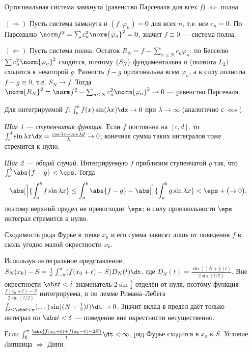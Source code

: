 \stmt Ортогональная система замкнута (равенство Парсеваля для всех $f$) $\iff$ полна.

\dok $(\Rightarrow)$ Пусть система замкнута и $(f,\varphi_n)=0$ для всех $n$, т.е. все $c_n=0$. По
Парсевалю $\norm f^2=\sum c_n^2\norm{\varphi_n}^2=0$, значит $f\equiv0$ — система полна.

$(\Leftarrow)$ Пусть система полна. Остаток $R_N=f-\sum_{n\le N}c_n\varphi_n$; по Бесселю
$\sum c_n^2\norm{\varphi_n}^2$ сходится, поэтому $\{S_N\}$ фундаментальна и (полнота $L_2$) сходится
к некоторой $g$. Разность $f-g$ ортогональна всем $\varphi_n$, а в силу полноты $f-g\equiv0$, т.е.
$S_N\to f$. Тогда $\norm{R_N}^2=\norm f^2-\sum_{n\le N}c_n^2\norm{\varphi_n}^2\to0$ — равенство
Парсеваля.

\stmt Для интегрируемой $f$: $\int_a^b f(x)\sin(\lambda x)\dx\to0$ при $\lambda\to\infty$
(аналогично с $\cos$).

\dok \emph{Шаг 1 — ступенчатая функция.} Если $f$ постоянна на $[c,d]$, то
$\int_c^d\sin\lambda x\dx=\tfrac{\cos\lambda c-\cos\lambda d}{\lambda}\to0$; конечная сумма таких
интегралов тоже стремится к нулю.

\emph{Шаг 2 — общий случай.} Интегрируемую $f$ приблизим
ступенчатой $g$ так, что $\int_a^b\abs{f-g}<\eps$. Тогда
\[
  \abs[\Big]{\int_a^b f\sin\lambda x}\le\int_a^b\abs{f-g}+\abs[\Big]{\int_a^b g\sin\lambda x}
  <\eps+\bigl(\to0\bigr),
\]
поэтому верхний предел не превосходит $\eps$; в силу произвольности $\eps$ интеграл стремится к
нулю.

\stmt Сходимость ряда Фурье в точке $x_0$ и его сумма зависят лишь от поведения $f$ в сколь угодно
малой окрестности $x_0$.

\dok Используя интегральное представление, $S_N(x_0)-S=\tfrac1\pi\int_{-\pi}^{\pi}(f(x_0+t)-S)D_N(t)\dt$,
где $D_N(t)=\tfrac{\sin((N+\frac12)t)}{2\sin(t/2)}$. Вне окрестности $\abs t<\delta$ знаменатель
$2\sin\tfrac t2$ отделён от нуля, поэтому функция $\tfrac{f(x_0+t)-S}{2\sin(t/2)}$ интегрируема, и по
лемме Римана–Лебега $\int_{\delta\le\abs t\le\pi}(\dots)\sin((N+\tfrac12)t)\dt\to0$. Значит вклад в
предел даёт только интеграл по $\abs t<\delta$ — поведение вне окрестности несущественно.

\stmt Если $\int_0^\pi\tfrac{\abs{f(x_0+t)+f(x_0-t)-2S}}{t}\dt<\infty$, ряд Фурье сходится в $x_0$ к
$S$. Условие Липшица $\Rightarrow$ Дини.

